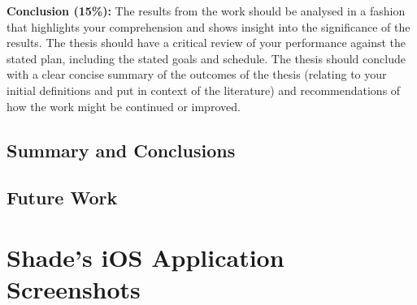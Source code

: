 \documentclass[12pt,openany,a4paper]{book}
\begin{document}
\textbf{Conclusion (15\%):} The results from the work should be analysed in a
fashion that highlights your comprehension and shows insight into the
significance of the results. The thesis should have a critical review of your
performance against the stated plan, including the stated goals and schedule.
The thesis should conclude with a clear concise summary of the outcomes of the
thesis (relating to your initial definitions and put in context of the
literature) and recommendations of how the work might be continued or improved.

\section{Summary and Conclusions}

\section{Future Work}
\label{secn:future_work}

\appendix


\newpage
{}
\mbox{}
\newpage



\cleardoublepage

\chapter{Shade's iOS Application Screenshots}
\label{app:shade_screenshots}
\end{document}
